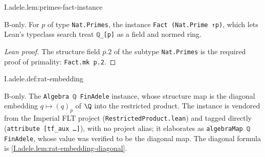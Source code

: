 \begin{lemma}
\bonly
{}
\end{lemma}
\begin{tfformal}{I.adele.lem:primes-fact-instance}
\begin{tffidelity}
B-only. For $p$ of type \texttt{Nat.Primes}, the instance \texttt{Fact (Nat.Prime ↑p)}, which lets Lean's typeclass search treat \texttt{ℚ\_[p]} as a field and normed ring.
\end{tffidelity}
\end{tfformal}
\begin{proof}[Lean proof]
The structure field $p.2$ of the subtype \texttt{Nat.Primes} is the required proof of primality: \texttt{Fact.mk p.2}.
\end{proof}

\begin{definition}
\bonly
{}
\end{definition}
\begin{tfformal}{I.adele.def:rat-embedding}
\begin{tffidelity}
B-only. The \texttt{Algebra ℚ FinAdele} instance, whose structure map is the diagonal embedding $q\mapsto(q)_p$ of $\Q$ into the restricted product. The instance is vendored from the Imperial FLT project (\texttt{RestrictedProduct.lean}) and tagged directly (\texttt{attribute [tf\_aux …]}), with no project alias; it elaborates as \texttt{algebraMap ℚ FinAdele}, whose value was verified to be the diagonal map. The diagonal formula is \cref{I.adele.lem:rat-embedding-diagonal}.
\end{tffidelity}
\end{tfformal}

